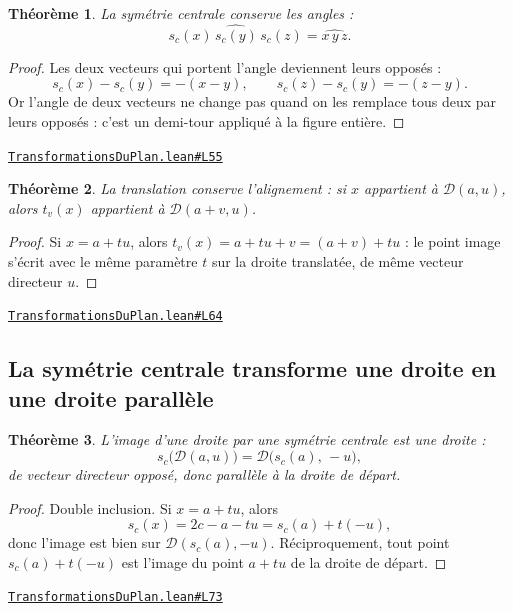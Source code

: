 \documentclass[11pt,a4paper]{article}
\theoremstyle{definition}
\theoremstyle{plain}
\newtheorem{theoreme}{Théorème}
\newcommand{\source}[2]{\par\smallskip\noindent\hfill{\footnotesize\href{#1}{\texttt{#2}}}\par\smallskip}
\begin{document}
\begin{theoreme}
La symétrie centrale conserve les angles :
\[ \widehat{s_c(x)\,s_c(y)\,s_c(z)} = \widehat{x\,y\,z} . \]
\end{theoreme}

\begin{proof}
Les deux vecteurs qui portent l'angle deviennent leurs opposés :
\[ s_c(x) - s_c(y) = -(x - y), \qquad s_c(z) - s_c(y) = -(z - y) . \]
Or l'angle de deux vecteurs ne change pas quand on les remplace tous deux par leurs
opposés : c'est un demi-tour appliqué à la figure entière.
\end{proof}
\source{https://github.com/Commutator-IO/learn-lean/blob/main/courses/01-college/03-transformations-du-plan/TransformationsDuPlan.lean\#L55}{TransformationsDuPlan.lean\#L55}

\begin{theoreme}
La translation conserve l'alignement : si $x$ appartient à $\mathcal{D}(a, u)$,
alors $t_v(x)$ appartient à $\mathcal{D}(a + v, u)$.
\end{theoreme}

\begin{proof}
Si $x = a + tu$, alors $t_v(x) = a + tu + v = (a + v) + tu$ : le point image s'écrit
avec le même paramètre $t$ sur la droite translatée, de même vecteur directeur $u$.
\end{proof}
\source{https://github.com/Commutator-IO/learn-lean/blob/main/courses/01-college/03-transformations-du-plan/TransformationsDuPlan.lean\#L64}{TransformationsDuPlan.lean\#L64}

\subsection{La symétrie centrale transforme une droite en une droite parallèle}

\begin{theoreme}
L'image d'une droite par une symétrie centrale est une droite :
\[ s_c\bigl(\mathcal{D}(a, u)\bigr) = \mathcal{D}\bigl(s_c(a),\, -u\bigr) , \]
de vecteur directeur opposé, donc parallèle à la droite de départ.
\end{theoreme}

\begin{proof}
Double inclusion. Si $x = a + tu$, alors
\[ s_c(x) = 2c - a - tu = s_c(a) + t(-u) , \]
donc l'image est bien sur $\mathcal{D}(s_c(a), -u)$. Réciproquement, tout point
$s_c(a) + t(-u)$ est l'image du point $a + tu$ de la droite de départ.
\end{proof}
\source{https://github.com/Commutator-IO/learn-lean/blob/main/courses/01-college/03-transformations-du-plan/TransformationsDuPlan.lean\#L73}{TransformationsDuPlan.lean\#L73}
\end{document}

